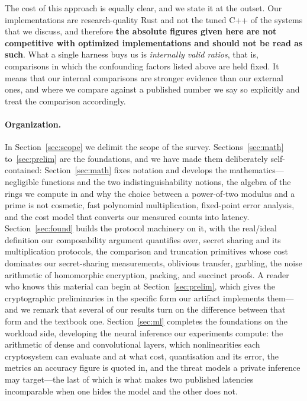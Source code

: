 \documentclass[11pt]{article}
\begin{document}
The cost of this approach is equally clear, and we state it at the outset. Our
implementations are research-quality Rust and not the tuned C++ of the systems that we
discuss, and therefore \textbf{the absolute figures given here are not competitive with
optimized implementations and should not be read as such}. What a single harness buys
us is \emph{internally valid ratios}, that is, comparisons in which the confounding
factors listed above are held fixed. It means that our internal comparisons are
stronger evidence than our external ones, and where we compare against a published
number we say so explicitly and treat the comparison accordingly.

\paragraph{Organization.} In Section~\ref{sec:scope} we delimit the scope of the
survey. Sections~\ref{sec:math} to~\ref{sec:prelim} are the foundations, and we have
made them deliberately self-contained: Section~\ref{sec:math} fixes notation and
develops the mathematics---negligible functions and the two indistinguishability
notions, the algebra of the rings we compute in and why the choice between a
power-of-two modulus and a prime is not cosmetic, fast polynomial multiplication,
fixed-point error analysis, and the cost model that converts our measured counts into
latency. Section~\ref{sec:found} builds the protocol machinery on it, with the
real/ideal definition our composability argument quantifies over, secret sharing and
its multiplication protocols, the comparison and truncation primitives whose cost
dominates our secret-sharing measurements, oblivious transfer, garbling, the noise
arithmetic of homomorphic encryption, packing, and succinct proofs. A reader who knows
this material can begin at Section~\ref{sec:prelim}, which gives the cryptographic
preliminaries in the specific form our artifact implements them---and we remark that
several of our results turn on the difference between that form and the textbook one.
Section~\ref{sec:ml} completes the foundations on the workload side, developing the
neural inference our experiments compute: the arithmetic of dense and convolutional
layers, which nonlinearities each cryptosystem can evaluate and at what cost,
quantisation and its error, the metrics an accuracy figure is quoted in, and the
threat models a private inference may target---the last of which is what makes two
published latencies incomparable when one hides the model and the other does not.
\end{document}
